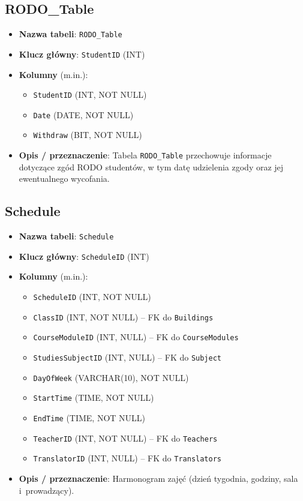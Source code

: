 \documentclass[12pt]{article}
\begin{document}
\subsection{RODO\_Table}
\begin{itemize}
    \item \textbf{Nazwa tabeli}: \texttt{RODO\_Table}
    \item \textbf{Klucz główny}: \texttt{StudentID} (INT)
    \item \textbf{Kolumny} (m.in.):
          \begin{itemize}
            \item \texttt{StudentID} (INT, NOT NULL)
            \item \texttt{Date} (DATE, NOT NULL)
            \item \texttt{Withdraw} (BIT, NOT NULL)
          \end{itemize}
    \item \textbf{Opis / przeznaczenie}:  
          Tabela \texttt{RODO\_Table} przechowuje informacje dotyczące zgód RODO studentów, w tym datę udzielenia zgody oraz jej ewentualnego wycofania.
\end{itemize}

\subsection{Schedule}
\begin{itemize}
    \item \textbf{Nazwa tabeli}: \texttt{Schedule}
    \item \textbf{Klucz główny}: \texttt{ScheduleID} (INT)
    \item \textbf{Kolumny} (m.in.):
          \begin{itemize}
            \item \texttt{ScheduleID} (INT, NOT NULL)
            \item \texttt{ClassID} (INT, NOT NULL) -- FK do \texttt{Buildings}
            \item \texttt{CourseModuleID} (INT, NULL) -- FK do \texttt{CourseModules}
            \item \texttt{StudiesSubjectID} (INT, NULL) -- FK do \texttt{Subject}
            \item \texttt{DayOfWeek} (VARCHAR(10), NOT NULL)
            \item \texttt{StartTime} (TIME, NOT NULL)
            \item \texttt{EndTime} (TIME, NOT NULL)
            \item \texttt{TeacherID} (INT, NOT NULL) -- FK do \texttt{Teachers}
            \item \texttt{TranslatorID} (INT, NULL) -- FK do \texttt{Translators}
          \end{itemize}
    \item \textbf{Opis / przeznaczenie}:  
          Harmonogram zajęć (dzień tygodnia, godziny, sala i~prowadzący).
\end{itemize}
\end{document}
